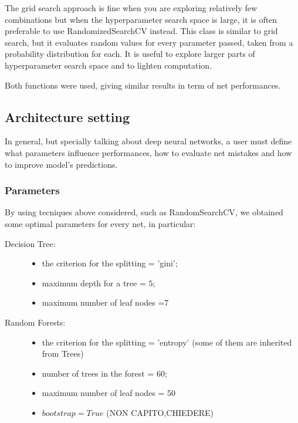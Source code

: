 \documentclass{article}
\begin{document}
The grid search approach is fine when you are exploring relatively few combinations but when the hyperparameter search space is large, it is often preferable to use RandomizedSearchCV instead. This class is similar to grid search, but it evaluates random values for every parameter passed, taken from a probability distribution for each.
It is useful to explore larger parts of hyperparameter search space and to lighten computation.

Both functions were used, giving similar results in term of net performances.


\subsection{Architecture setting}
In general, but specially talking about deep neural networks, a user must define what parameters influence performances, how to evaluate net mistakes and how to improve model's predictions.


\subsubsection{Parameters}

By using tecniques above considered, such as RandomSearchCV, we obtained some optimal parameters for every net, in particular:

\begin{description}[align=left]
\item [SVM:]
\end{description}

\begin{description}
\item [Decision Tree:] \begin{itemize}
\item the criterion for the splitting = 'gini';
\item maximum depth for a tree = $5$;
\item maximum number of leaf nodes =7
\end{itemize}
\end{description}

\begin{description}
\item[Random Forests:]\begin{itemize}
\item the criterion for the splitting = 'entropy' (some of them are inherited from Trees)
\item number of trees in the forest = 60;
\item maximum number of leaf nodes = 50
\item $bootstrap=True$ (NON CAPITO,CHIEDERE)
\end{itemize}
\end{description}
                            
\end{document}
